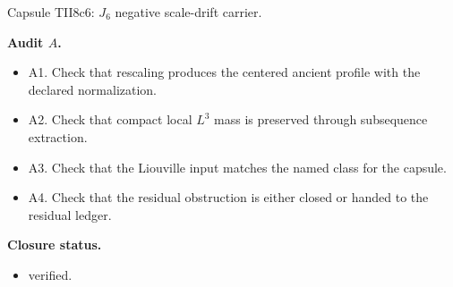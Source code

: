 \documentclass[11pt]{amsart}
\newcommand{\capsulefield}[1]{\par\smallskip\noindent\textbf{#1.}\ }
\begin{document}
\begin{proofcapsule}{Capsule TII8c6: $J_6$ negative scale-drift carrier.}
  \capsulefield{Audit \(A\)}
  \begin{itemize}[leftmargin=1.8em]
  \item A1. Check that rescaling produces the centered ancient profile with the declared normalization.
  \item A2. Check that compact local $L^3$ mass is preserved through subsequence extraction.
  \item A3. Check that the Liouville input matches the named class for the capsule.
  \item A4. Check that the residual obstruction is either closed or handed to the residual ledger.
  \end{itemize}
  \capsulefield{Closure status}
  \begin{itemize}[leftmargin=1.8em]
  \item verified.
  \end{itemize}
\end{proofcapsule}
\end{document}
